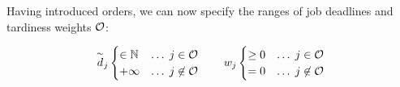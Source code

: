 \begin{itemize}
\begin{itemize}
            Having introduced orders, we can now specify the ranges of job deadlines and tardiness weights
             $\mathcal{O}$:

            $$
            \overset{\sim}{d}_{j} \begin{cases}
                \in \mathbb{N}    &\dots\;   j     \in \mathcal{O} \\
                +\infty   &\dots\;   j \not\in \mathcal{O}
            \end{cases}
            \qquad
            w_{j} \begin{cases}
                \geq 0   &\dots\;   j     \in \mathcal{O} \\
                   = 0   &\dots\;   j \not\in \mathcal{O}
            \end{cases}
            $$

    \end{itemize}


\end{itemize}
